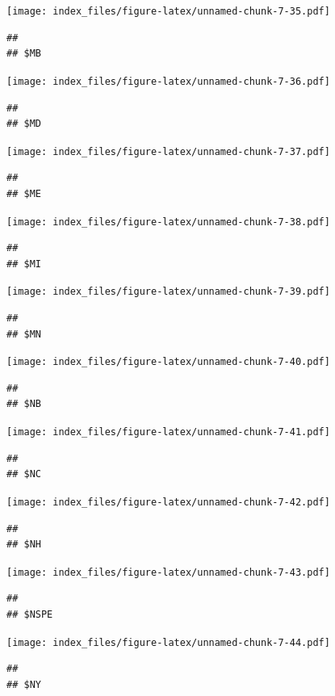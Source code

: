 \documentclass[]{article}
\begin{document}
\texttt{[image: index\_files/figure-latex/unnamed-chunk-7-35.pdf]}

\begin{verbatim}
## 
## $MB
\end{verbatim}

\texttt{[image: index\_files/figure-latex/unnamed-chunk-7-36.pdf]}

\begin{verbatim}
## 
## $MD
\end{verbatim}

\texttt{[image: index\_files/figure-latex/unnamed-chunk-7-37.pdf]}

\begin{verbatim}
## 
## $ME
\end{verbatim}

\texttt{[image: index\_files/figure-latex/unnamed-chunk-7-38.pdf]}

\begin{verbatim}
## 
## $MI
\end{verbatim}

\texttt{[image: index\_files/figure-latex/unnamed-chunk-7-39.pdf]}

\begin{verbatim}
## 
## $MN
\end{verbatim}

\texttt{[image: index\_files/figure-latex/unnamed-chunk-7-40.pdf]}

\begin{verbatim}
## 
## $NB
\end{verbatim}

\texttt{[image: index\_files/figure-latex/unnamed-chunk-7-41.pdf]}

\begin{verbatim}
## 
## $NC
\end{verbatim}

\texttt{[image: index\_files/figure-latex/unnamed-chunk-7-42.pdf]}

\begin{verbatim}
## 
## $NH
\end{verbatim}

\texttt{[image: index\_files/figure-latex/unnamed-chunk-7-43.pdf]}

\begin{verbatim}
## 
## $NSPE
\end{verbatim}

\texttt{[image: index\_files/figure-latex/unnamed-chunk-7-44.pdf]}

\begin{verbatim}
## 
## $NY
\end{verbatim}
\end{document}
